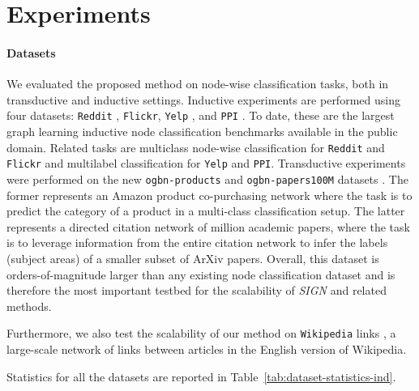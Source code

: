\documentclass{article}
\begin{document}
\section{Experiments} \label{sec:experiments}

\paragraph{Datasets}
We evaluated the proposed method on node-wise classification tasks, both in transductive and inductive settings. 
Inductive experiments are performed using four datasets: \texttt{Reddit} \cite{GraphSAGE}, \texttt{Flickr}, \texttt{Yelp} \cite{DBLP:journals/corr/abs-1907-04931}, and \texttt{PPI} \cite{Zitnik_2017}. To date, these are the largest graph learning inductive node classification benchmarks available in the public domain. Related tasks are multiclass node-wise classification for \texttt{Reddit} and \texttt{Flickr} and multilabel classification for \texttt{Yelp} and \texttt{PPI}. Transductive experiments were performed on the new \texttt{ogbn-products} and \texttt{ogbn-papers100M} datasets \cite{ogb2020}. The former represents an Amazon product co-purchasing network \cite{Bhatia16} where the task is to predict the category of a product in a multi-class classification setup. The latter represents a directed citation network of  million academic papers, where the task is to leverage information from the entire citation network to infer the labels (subject areas) of a smaller subset of ArXiv papers. Overall, this dataset is orders-of-magnitude larger than any existing node classification dataset and is therefore the most important testbed for the scalability of \textit{SIGN} and related methods.

Furthermore, we also test the scalability of our method on \texttt{Wikipedia} links \cite{Konect2017wikipedia}, a large-scale network of links between articles in the English version of Wikipedia. 

Statistics for all the datasets are reported in Table~\ref{tab:dataset-statistics-ind}.
\end{document}
